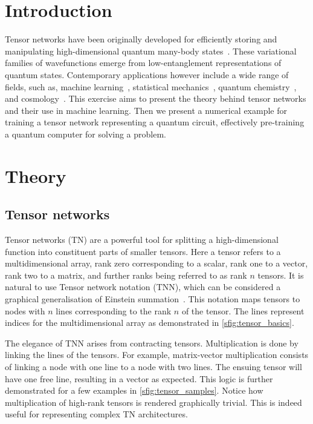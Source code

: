 \section{Introduction}

Tensor networks have been originally developed for efficiently storing and manipulating high-dimen\-sional quantum many-body states~\cite{PhysRevLett.69.2863}. These variational families of wavefunctions emerge from low-entanglement representations of quantum states. Contemporary applications however include a wide range of fields, such as, machine learning~\cite{Roberts2019}, statistical mechanics~\cite{Levin_2007}, quantum chemistry~\cite{White1999}, and cosmology~\cite{Bao_2017}.
This exercise aims to present the theory behind tensor networks and their use in machine learning. Then we present a numerical example for training a tensor network representing a quantum circuit, effectively pre-training a quantum computer for solving a problem.



\section{Theory}

\subsection{Tensor networks}

Tensor networks (TN) are a powerful tool for splitting a high-dimensional function into constituent parts of smaller tensors. 
Here a tensor refers to a multidimensional array, rank zero corresponding to a scalar, rank one to a vector, rank two to a matrix, and further ranks being referred to as rank $n$ tensors.
It is natural to use Tensor network notation (TNN), which can be considered a graphical generalisation of Einstein summation~\cite{Bridgeman_2017}. This notation maps tensors to  nodes with $n$ lines corresponding to the rank $n$ of the tensor. The lines represent indices for the multidimensional array as demonstrated in \cref{sfig:tensor_basics}.

The elegance of TNN arises from contracting tensors. Multiplication is done by linking the lines of the tensors. For example, matrix-vector multiplication consists of linking a node with one line to a node with two lines. The ensuing tensor will have one free line, resulting in a vector as expected.
This logic is further demonstrated for a few examples in \cref{sfig:tensor_samples}.
Notice how multiplication of high-rank tensors is rendered graphically trivial. This is indeed useful for representing complex TN architectures.



